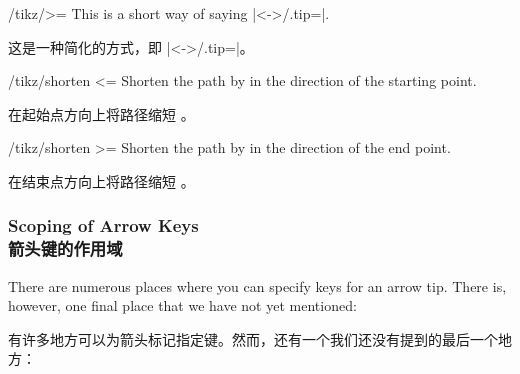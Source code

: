 \begin{key}{/tikz/>=}
    This is a short way of saying |<->/.tip=|.
    
    这是一种简化的方式，即 |<->/.tip=|。
\begin{codeexample}[preamble={\usetikzlibrary{arrows.meta}}]
\begin{tikzpicture}[scale=2,ultra thick]
  \begin{scope}[>=Latex]
    \draw[>->]    (0pt,3ex) -- (1cm,3ex);
    \draw[|<->>|] (0pt,2ex) -- (1cm,2ex);
  \end{scope}
  \begin{scope}[>=Stealth]
    \draw[>->]    (0pt,1ex) -- (1cm,1ex);
    \draw[|<<.<->|] (0pt,0ex) -- (1cm,0ex);
  \end{scope}
\end{tikzpicture}
\end{codeexample}
\end{key}

\begin{key}{/tikz/shorten <=}
    Shorten the path by  in the direction of the starting point.

    在起始点方向上将路径缩短 。


\end{key}

\begin{key}{/tikz/shorten >=}
    Shorten the path by  in the direction of the end point.

    在结束点方向上将路径缩短 。
\end{key}


\subsubsection{Scoping of Arrow Keys\\箭头键的作用域}
\label{section-arrow-scopes}

There are numerous places where you can specify keys for an arrow tip. There
is, however, one final place that we have not yet mentioned:

有许多地方可以为箭头标记指定键。然而，还有一个我们还没有提到的最后一个地方：

